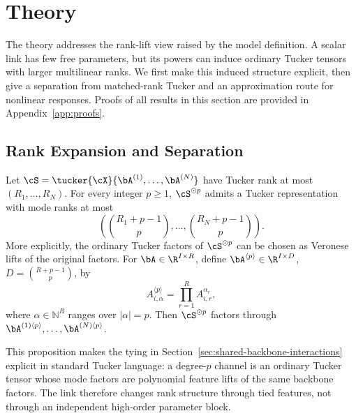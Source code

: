 \section{Theory}
\label{sec:theory}

The theory addresses the rank-lift view raised by the model definition. A
scalar link has few free parameters, but its powers can induce ordinary Tucker
tensors with larger multilinear ranks. We first make this induced structure
explicit, then give a separation from matched-rank Tucker and an approximation
route for nonlinear responses. Proofs of all results in this section are
provided in Appendix~\ref{app:proofs}.

\subsection{Rank Expansion and Separation}

\begin{proposition}
\label{prop:rank-expansion}
Let
\(\cS=\tucker{\cX}{\bA^{(1)},\ldots,\bA^{(N)}}\)
have Tucker rank at most \((R_1,\ldots,R_N)\). For every integer \(p\ge 1\),
\(\cS^{\odot p}\) admits a Tucker representation with mode ranks at most
\begin{equation}
  \left(
  \binom{R_1+p-1}{p},\ldots,\binom{R_N+p-1}{p}
  \right).
\end{equation}
More explicitly, the ordinary Tucker factors of \(\cS^{\odot p}\) can be
chosen as Veronese lifts of the original factors. For
\(\bA\in\R^{I\times R}\), define
\(\bA^{\langle p\rangle}\in\R^{I\times D}\),
\(D=\binom{R+p-1}{p}\), by
\begin{equation}
  A^{\langle p\rangle}_{i,\alpha}
  =
  \prod_{r=1}^{R} A_{i,r}^{\alpha_r},
\end{equation}
where \(\alpha\in\mathbb N^R\) ranges over \(|\alpha|=p\).
Then \(\cS^{\odot p}\) factors through
\(\bA^{(1)\langle p\rangle},\ldots,\bA^{(N)\langle p\rangle}\).
\end{proposition}

This proposition makes the tying in
Section~\ref{sec:shared-backbone-interactions} explicit in standard Tucker
language: a degree-\(p\) channel is an ordinary Tucker tensor whose mode
factors are polynomial feature lifts of the same backbone factors. The link
therefore changes rank structure through tied features, not through an
independent high-order parameter block.

